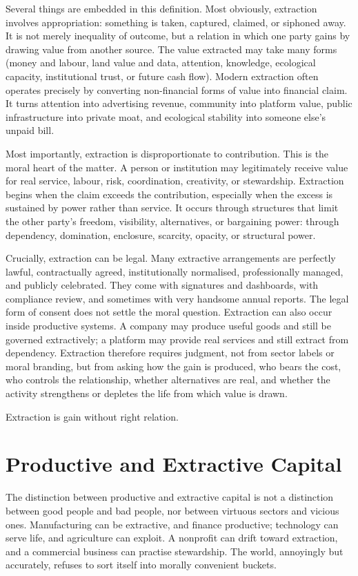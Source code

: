 \documentclass[11pt,a4paper,oneside]{book}
\begin{document}
Several things are embedded in this definition. Most obviously, extraction involves appropriation: something is taken, captured, claimed, or siphoned away. It is not merely inequality of outcome, but a relation in which one party gains by drawing value from another source. The value extracted may take many forms (money and labour, land value and data, attention, knowledge, ecological capacity, institutional trust, or future cash flow). Modern extraction often operates precisely by converting non-financial forms of value into financial claim. It turns attention into advertising revenue, community into platform value, public infrastructure into private moat, and ecological stability into someone else's unpaid bill.

Most importantly, extraction is disproportionate to contribution. This is the moral heart of the matter. A person or institution may legitimately receive value for real service, labour, risk, coordination, creativity, or stewardship. Extraction begins when the claim exceeds the contribution, especially when the excess is sustained by power rather than service. It occurs through structures that limit the other party's freedom, visibility, alternatives, or bargaining power: through dependency, domination, enclosure, scarcity, opacity, or structural power.

Crucially, extraction can be legal. Many extractive arrangements are perfectly lawful, contractually agreed, institutionally normalised, professionally managed, and publicly celebrated. They come with signatures and dashboards, with compliance review, and sometimes with very handsome annual reports. The legal form of consent does not settle the moral question. Extraction can also occur inside productive systems. A company may produce useful goods and still be governed extractively; a platform may provide real services and still extract from dependency. Extraction therefore requires judgment, not from sector labels or moral branding, but from asking how the gain is produced, who bears the cost, who controls the relationship, whether alternatives are real, and whether the activity strengthens or depletes the life from which value is drawn.

Extraction is gain without right relation.

\section*{Productive and Extractive Capital}

The distinction between productive and extractive capital is not a distinction between good people and bad people, nor between virtuous sectors and vicious ones. Manufacturing can be extractive, and finance productive; technology can serve life, and agriculture can exploit. A nonprofit can drift toward extraction, and a commercial business can practise stewardship. The world, annoyingly but accurately, refuses to sort itself into morally convenient buckets.
\end{document}
